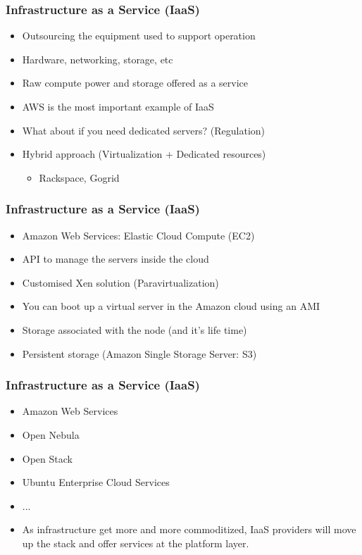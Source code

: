 \documentclass{beamer}
\begin{document}
\begin{frame}
\frametitle{Infrastructure as a Service (IaaS)}
\begin{itemize}
  \item Outsourcing the equipment used to support operation
  \item Hardware, networking, storage, etc
  \item Raw compute power and storage offered as a service
  \item AWS is the most important example of IaaS
  \item What about if you need dedicated servers? (Regulation)
  \item Hybrid approach (Virtualization + Dedicated resources)
     \begin{itemize}
     \item Rackspace, Gogrid
     \end{itemize}
\end{itemize}
\end{frame}


\begin{frame}
\frametitle{Infrastructure as a Service (IaaS)}
\begin{itemize}
  \item Amazon Web Services: Elastic Cloud Compute (EC2)
  \item API to manage the servers inside the cloud
  \item Customised Xen solution (Paravirtualization)
  \item You can boot up a virtual server in the Amazon cloud using an AMI
  \item Storage associated with the node (and it's life time) 
  \item Persistent storage (Amazon Single Storage Server: S3)
\end{itemize}
\end{frame}

\begin{frame}
\frametitle{Infrastructure as a Service (IaaS)}
\begin{itemize}
  \item Amazon Web Services
  \item Open Nebula
  \item Open Stack
  \item Ubuntu Enterprise Cloud Services
  \item ...
  \item As infrastructure get more and more commoditized, IaaS providers will move up the stack and offer services at the platform layer.
\end{itemize}
\end{frame}
\end{document}
